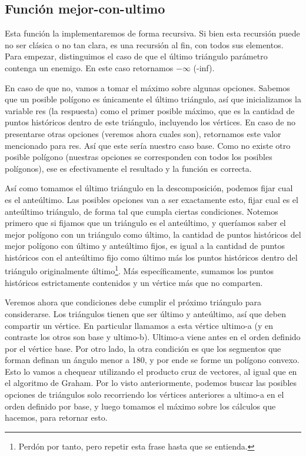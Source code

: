 \subsection{Función mejor-con-ultimo}
\par{Esta función la implementaremos de forma recursiva. Si bien esta recursión puede no ser clásica o no tan clara, es una recursión al fin, con todos sus elementos.
Para empezar, distinguimos el caso de que el último triángulo parámetro contenga un enemigo. En este caso retornamos $-\infty$ (-inf). } \newline
\par{En caso de que no, vamos a tomar el máximo sobre algunas opciones. Sabemos que un posible polígono es únicamente el último triángulo, así que inicializamos la variable res (la respuesta) como el primer posible máximo, que es la cantidad de puntos históricos dentro de este triángulo, incluyendo los vértices.
En caso de no presentarse otras opciones (veremos ahora cuales son), retornamos este valor mencionado para res. Así que este sería nuestro caso base. Como no existe otro posible polígono (nuestras opciones se corresponden con todos los posibles polígonos), ese es efectivamente el resultado y la función es correcta.} \newline
\par{
Así como tomamos el último triángulo en la descomposición, podemos fijar cual es el anteúltimo.
Las posibles opciones van a ser exactamente esto, fijar cual es el anteúltimo triángulo, de forma tal que cumpla ciertas condiciones.
Notemos primero que si fijamos que un triángulo es el anteúltimo, y queríamos saber el mejor polígono con un triángulo como último, la cantidad de puntos históricos del mejor polígono con último y anteúltimo fijos, es igual a la cantidad de puntos históricos con el anteúltimo fijo como último más los puntos históricos dentro del triángulo originalmente último\footnote{Perdón por tanto, pero repetir esta frase hasta que se entienda.}. Más específicamente, sumamos los puntos históricos estrictamente contenidos y un vértice más que no comparten.
} \newline
\par{Veremos ahora que condiciones debe cumplir el próximo triángulo para considerarse. Los triángulos tienen que ser último y anteúltimo, así que deben compartir un vértice. En particular llamamos a esta vértice ultimo-a (y en contraste los otros son base y ultimo-b). Ultimo-a viene antes en el orden definido por el vértice base. Por otro lado, la otra condición es que los segmentos que forman definan un ángulo menor a 180, y por ende se forme un polígono convexo. Esto lo vamos a chequear utilizando el producto cruz de vectores, al igual que en el algoritmo de Graham. 
Por lo visto anteriormente, podemos buscar las posibles opciones de triángulos solo recorriendo los vértices anteriores a ultimo-a en el orden definido por base, y luego tomamos el máximo sobre los cálculos que hacemos, para retornar esto.} \newline
 
